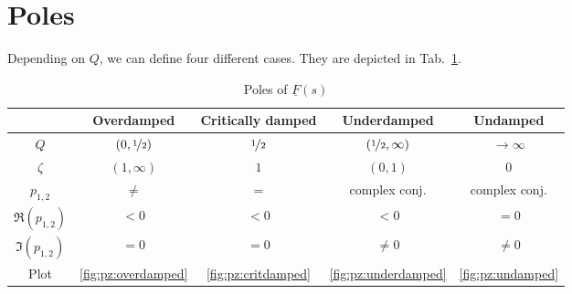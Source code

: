 \documentclass{article}[11pt]
\begin{document}
\section{Poles}

Depending on $Q$, we can define four different cases. 
They are depicted in Tab.~\ref{tab:pz}.

\begin{table}[H]
  \centering
  \caption{Poles of $\underline{F}(s)$}
  \begin{tabular}{ccccc}
  \toprule
                           & \textbf{Overdamped}               & \textbf{Critically damped} & \textbf{Underdamped}                    & \textbf{Undamped}     \\ \midrule
  $Q$                       & $\left(0, \nicefrac{1}{2}\right)$ & $\nicefrac{1}{2}$          & $\left(\nicefrac{1}{2}, \infty\right)$ & $\rightarrow \infty$  \\ 
  $\zeta$                   & $\left(1, \infty\right)$          & $1$                        & $\left(0, 1\right)$                    & $0$                   \\ \hline
  $p_{1,2}$                 & $\neq$                            & $=$                        & complex conj.                          & complex conj.         \\
  $\Re\left(p_{1,2}\right)$ & $<0$                              & $<0$                       & $<0$                                   & $=0$                  \\
  $\Im\left(p_{1,2}\right)$ & $=0$                              & $=0$                       & $\neq0$                                & $\neq0$               \\
  Plot                      & \ref{fig:pz:overdamped}           & \ref{fig:pz:critdamped}    & \ref{fig:pz:underdamped}               & \ref{fig:pz:undamped} \\ \toprule
  \end{tabular}
  \label{tab:pz}
\end{table}
\end{document}
